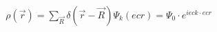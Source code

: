 \documentclass[preview]{standalone}
\begin{document}
\begin{align*}
\rho(\vec{r}) = \sum_{\vec{R}} \delta(\vec{r} - \vec{R}) \Psi_k(ec{r}) = \Psi_0 \cdot e^{i ec{k} \cdot ec{r}}
\end{align*}
\end{document}
